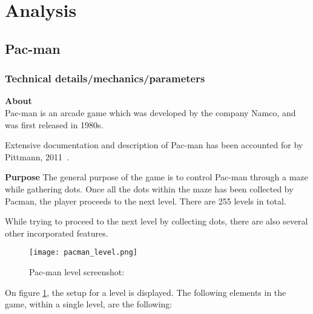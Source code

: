 
\section{Analysis} \label{sec:analysis}




\subsection{Pac-man}

\subsubsection{Technical details/mechanics/parameters}

\textbf{About}\\
Pac-man is an arcade game which was developed by the company Namco, and was first released in 1980s.

Extensive documentation and description of Pac-man has been accounted for by Pittmann, 2011~\cite{Pittman2011}.

\textbf{Purpose}
The general purpose of the game is to control Pac-man through a maze while gathering dots. Once all the dots within the maze has been collected by Pacman, the player proceeds to the next level. There are 255 levels in total.

While trying to proceed to the next level by collecting dots, there are also several other incorporated features.

\begin{figure}[!htbp]
\centering
\texttt{[image: pacman\_level.png]}
\caption{Pac-man level screenshot: \cite{Pittman2011} }
\label{fig:Pacman}
\end{figure}


On figure \ref{fig:Pacman}, the setup for a level is displayed. The following elements in the game, within a single level, are the following:

